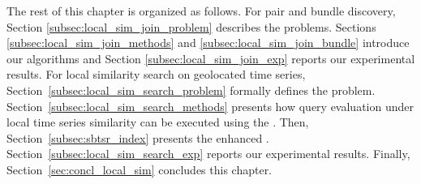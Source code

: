 The rest of this chapter is organized as follows. For pair and bundle discovery, Section \ref{subsec:local_sim_join_problem} describes the problems. Sections \ref{subsec:local_sim_join_methods} and \ref{subsec:local_sim_join_bundle} introduce our algorithms and Section \ref{subsec:local_sim_join_exp} reports our experimental results. For local similarity search on geolocated time series, Section~\ref{subsec:local_sim_search_problem} formally defines the problem. Section~\ref{subsec:local_sim_search_methods} presents how query evaluation under local time series similarity can be executed using the \btsr. Then, Section~\ref{subsec:sbtsr_index} presents the enhanced \sbtsr. Section~\ref{subsec:local_sim_search_exp} reports our experimental results. Finally, Section~\ref{sec:concl_local_sim} concludes this chapter.